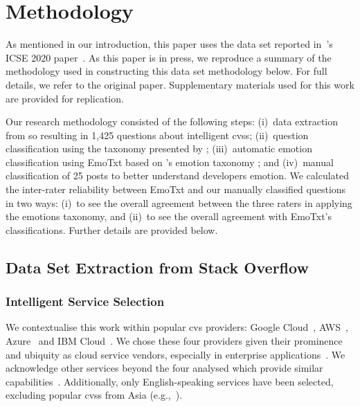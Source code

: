 \section{Methodology}\label{semotion2020:sec:methodology}

As mentioned in our introduction, this paper uses the data set reported in~\citeauthor{Cummaudo:2020icse}'s ICSE 2020 paper~\citep{Cummaudo:2020icse}. As this paper is in press, we reproduce a summary of the methodology used in constructing this data set methodology below. For full details, we refer to the original paper. Supplementary materials used for this work are provided for replication.\footnotemark[1]

Our research methodology consisted of the following steps: (i)~data extraction from \gls{so} resulting in 1,425 questions about intelligent \glspl{cvs}; (ii)~question classification using the taxonomy presented by \citet{Beyer:2018fm}; (iii)~automatic emotion classification using EmoTxt based on \citeauthor{shaver1987}'s emotion taxonomy \citep{shaver1987}; and (iv)~manual classification of 25 posts to better understand developers emotion. We calculated the inter-rater reliability between EmoTxt and our manually classified questions in two ways: (i)~to see the overall agreement between the three raters in applying the \citeauthor{shaver1987} emotions taxonomy, and (ii)~to see the overall agreement with EmoTxt's classifications. Further details are provided below.

\def \alexnumauthor {second}

\subsection{Data Set Extraction from Stack Overflow}

\subsubsection{Intelligent Service Selection}

We contextualise this work within popular \gls{cvs} providers: Google Cloud~, AWS~, Azure~ and IBM Cloud~.
We chose these four providers given their prominence and ubiquity as cloud service vendors, especially in enterprise applications~\citep{RightScaleInc:2018kJ}. We acknowledge other services beyond the four analysed which provide similar capabilities~. Additionally, only English-speaking services have been selected, excluding popular \glspl{cvs} from Asia (e.g.,~).


